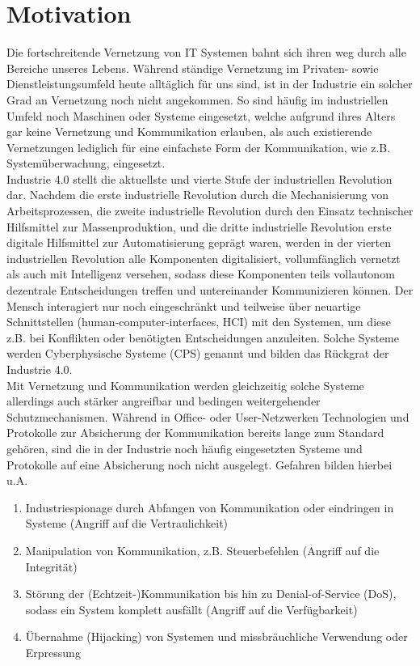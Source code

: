 \documentclass[conference]{IEEEtran}
\begin{document}
%

\section{Motivation}
Die fortschreitende Vernetzung von IT Systemen bahnt sich ihren weg durch alle Bereiche unseres Lebens. Während ständige Vernetzung im Privaten- sowie Dienstleistungsumfeld heute alltäglich für uns sind, ist in der Industrie ein solcher Grad an Vernetzung noch nicht angekommen. So sind häufig im industriellen Umfeld noch Maschinen oder Systeme eingesetzt, welche aufgrund ihres Alters gar keine Vernetzung und Kommunikation erlauben, als auch existierende Vernetzungen lediglich für eine einfachste Form der Kommunikation, wie z.B. Systemüberwachung, eingesetzt.\\

Industrie 4.0 stellt die aktuellste und vierte Stufe der industriellen Revolution dar. Nachdem die erste industrielle Revolution durch die Mechanisierung von Arbeitsprozessen, die zweite industrielle Revolution durch den Einsatz technischer Hilfsmittel zur Massenproduktion, und die dritte industrielle Revolution erste digitale Hilfsmittel zur Automatisierung geprägt waren, werden in der vierten industriellen Revolution alle Komponenten digitalisiert, vollumfänglich vernetzt als auch mit Intelligenz versehen, sodass diese Komponenten teils vollautonom dezentrale Entscheidungen treffen und untereinander Kommunizieren können. Der Mensch interagiert nur noch eingeschränkt und teilweise über neuartige Schnittstellen (human-computer-interfaces, HCI) mit den Systemen, um diese z.B. bei Konflikten oder benötigten Entscheidungen anzuleiten. Solche Systeme werden Cyberphysische Systeme (CPS) genannt und bilden das Rückgrat der Industrie 4.0.\\

Mit Vernetzung und Kommunikation werden gleichzeitig solche Systeme allerdings auch stärker angreifbar und bedingen weitergehender Schutzmechanismen. Während in Office- oder User-Netzwerken
Technologien und Protokolle zur Absicherung der Kommunikation bereits lange zum Standard gehören, sind die in der Industrie noch häufig eingesetzten Systeme und Protokolle auf eine Absicherung noch nicht ausgelegt. Gefahren bilden hierbei u.A.

\vspace{.5em}

\renewcommand{\labelenumi}{\alph{enumi})}
\begin{enumerate}
	\item Industriespionage durch Abfangen von Kommunikation oder eindringen in Systeme (Angriff auf die Vertraulichkeit)
	\item Manipulation von Kommunikation, z.B. Steuerbefehlen (Angriff auf die Integrität)
	\item Störung der (Echtzeit-)Kommunikation bis hin zu Denial-of-Service (DoS), sodass ein System komplett ausfällt (Angriff auf die Verfügbarkeit)
	\item Übernahme (Hijacking) von Systemen und missbräuchliche Verwendung oder Erpressung
\end{enumerate}
\end{document}
